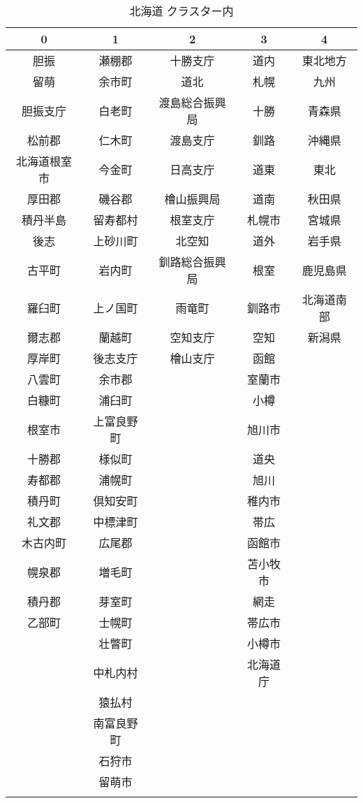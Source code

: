 \begin{table}[h]
  \center
  \caption{北海道 クラスター内}
  \label{h_100_5}
  \begin{tabular}{|c|c|c|c|c|} \hline
    0 & 1 & 2 & 3 & 4 \\ \hline \hline
    胆振 & 瀬棚郡 & 十勝支庁 & 道内 & 東北地方 \\
    留萌 & 余市町 & 道北 & 札幌 & 九州 \\
    胆振支庁 & 白老町 & 渡島総合振興局 & 十勝 & 青森県 \\
    松前郡 & 仁木町 & 渡島支庁 & 釧路 & 沖縄県 \\
    北海道根室市 & 今金町 & 日高支庁 & 道東 & 東北 \\ \hline
    厚田郡 & 磯谷郡 & 檜山振興局 & 道南 & 秋田県 \\
    積丹半島 & 留寿都村 & 根室支庁 & 札幌市 & 宮城県 \\
    後志 & 上砂川町 & 北空知 & 道外 & 岩手県 \\
    古平町 & 岩内町 & 釧路総合振興局 & 根室 & 鹿児島県 \\
    羅臼町 & 上ノ国町 & 雨竜町 & 釧路市 & 北海道南部 \\ \hline
    爾志郡 & 蘭越町 & 空知支庁 & 空知 & 新潟県 \\
    厚岸町 & 後志支庁 & 檜山支庁 & 函館 &  \\
    八雲町 & 余市郡 &  & 室蘭市 &  \\
    白糠町 & 浦臼町 &  & 小樽 &  \\
    根室市 & 上富良野町 &  & 旭川市 &  \\ \hline
    十勝郡 & 様似町 &  & 道央 &  \\
    寿都郡 & 浦幌町 &  & 旭川 &  \\
    積丹町 & 倶知安町 &  & 稚内市 &  \\
    礼文郡 & 中標津町 &  & 帯広 &  \\
    木古内町 & 広尾郡 &  & 函館市 &  \\ \hline
    幌泉郡 & 増毛町 &  & 苫小牧市 &  \\
    積丹郡 & 芽室町 &  & 網走 &  \\
    乙部町 & 士幌町 &  & 帯広市 &  \\
     & 壮瞥町 &  & 小樽市 &  \\
     & 中札内村 &  & 北海道庁 &  \\ \hline
     & 猿払村 &  &  &  \\
     & 南富良野町 &  &  &  \\
     & 石狩市 &  &  &  \\
     & 留萌市 &  &  &  \\
     &  &  &  &  \\ \hline
  \end{tabular}
\end{table}
